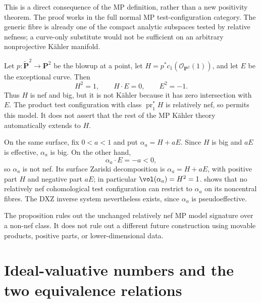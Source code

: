 This is a direct consequence of the MP definition, rather than a new
positivity theorem.  The proof works in the full normal MP
test-configuration category.  The
generic fibre is already one of the compact analytic subspaces tested by
relative nefness; a curve-only substitute would not be sufficient on an
arbitrary nonprojective K\"ahler manifold.

\begin{example}\label{ex:pseff-nef-big}
Let \(p:\widetilde{\mathbf P}^2\to\mathbf P^2\) be the blowup at a point,
let \(H=p^*c_1(\mathcal O_{\mathbf P^2}(1))\), and let \(E\) be the
exceptional curve.  Then
\[
                         H^2=1,\qquad H\cdot E=0,
                         \qquad E^2=-1.
\tag{71.4}\label{eq:pseff-blowup-intersections}
\]
Thus \(H\) is nef and big, but it is not K\"ahler because it has zero
intersection with \(E\).  The product test configuration with class
\(\operatorname{pr}_1^*H\) is relatively nef, so
 permits this model.  It does not
assert that the rest of the MP K\"ahler theory automatically extends to
\(H\).
\end{example}

\begin{example}\label{ex:pseff-big-nonnef}
On the same surface, fix \(0<a<1\) and put
\(\alpha_a=H+aE\).  Since \(H\) is big and \(aE\) is effective,
\(\alpha_a\) is big.  On the other hand,
\[
                         \alpha_a\cdot E=-a<0,
\tag{71.5}\label{eq:pseff-big-nonnef-intersection}
\]
so \(\alpha_a\) is not nef.  Its surface Zariski decomposition is
\(\alpha_a=H+aE\), with positive part \(H\) and negative part \(aE\);
in particular \(\vol(\alpha_a)=H^2=1\).
 shows that no relatively nef
cohomological test configuration can restrict to \(\alpha_a\) on its
noncentral fibres.  The DXZ inverse system nevertheless exists, since
\(\alpha_a\) is pseudoeffective.
\end{example}

\begin{remark}\label{rem:pseff-obstruction-scope}
The proposition rules out the unchanged relatively nef MP model signature
over a non-nef class.  It does not rule out a different future construction
using movable products, positive parts, or lower-dimensional data.
\end{remark}

\section{Ideal-valuative numbers and the two equivalence relations}

